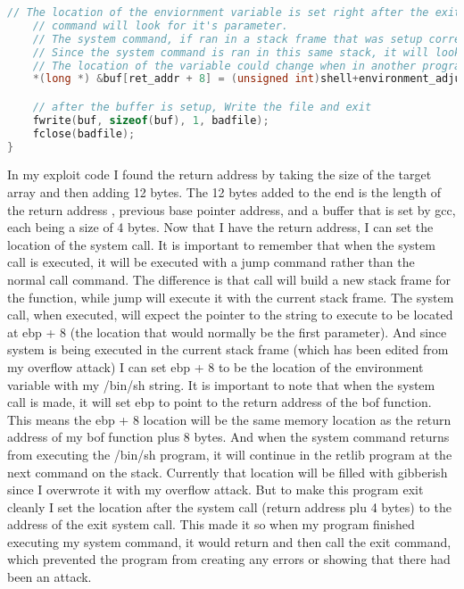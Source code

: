 \documentclass[14pt]{extarticle}
\begin{document}
\begin{lstlisting}[language=c]
	// The location of the enviornment variable is set right after the exit() command, because this is where the system
	// command will look for it's parameter.
	// The system command, if ran in a stack frame that was setup correctly, would expect to find it's parameter on the stack just before the return address (ebp + 8)
	// Since the system command is ran in this same stack, it will look for it's parameter 8 bytes up on the stack, which is where this will set the location to the shell
	// The location of the variable could change when in another program, so the location is set with an adjustment
	*(long *) &buf[ret_addr + 8] = (unsigned int)shell+environment_adjust; // "/bin/sh"

	// after the buffer is setup, Write the file and exit
	fwrite(buf, sizeof(buf), 1, badfile);
	fclose(badfile);
}
\end{lstlisting}
In my exploit code I found the return address by taking the size of the target array and then adding 12 bytes. The 12 bytes added to the end is the length of the return address , previous base pointer address, and a buffer that is set by gcc, each being a size of 4 bytes.  Now that I have the return address, I can set the location of the system call. It is important to remember that when the system call is executed, it will be executed with a jump command rather than the normal call command. The difference is that call will build a new stack frame for the function, while jump will execute it with the current stack frame. The system call, when executed, will expect the pointer to the string to execute to be located at ebp + 8 (the location that would normally be the first parameter). And since system is being executed in the current stack frame (which has been edited from my overflow attack) I can set ebp + 8 to be the location of the environment variable with my /bin/sh string. It is important to note that when the system call is made, it will set ebp to point to the return address of the bof function. This means the ebp + 8 location will be the same memory location as the return address of my bof function plus 8 bytes. And when the system command returns from executing the /bin/sh program, it will continue in the retlib program at the next command on the stack. Currently that location will be filled with gibberish since I overwrote it with my overflow attack. But to make this program exit cleanly I set the location after the system call (return address plu 4 bytes) to the address of the exit system call. This made it so when my program finished executing my system command, it would return and then call the exit command, which prevented the program from creating any errors or showing that there had been an attack\cite{seed-retlibc}.\\
\end{document}
